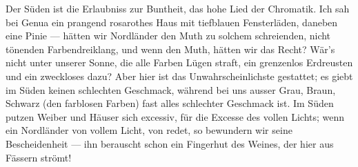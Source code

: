 Der Süden ist die Erlaubniss zur Buntheit, das hohe Lied der Chromatik. Ich sah bei Genua ein prangend rosarothes Haus mit tiefblauen Fensterläden, daneben eine Pinie — hätten wir Nordländer den Muth zu solchem schreienden, nicht tönenden Farbendreiklang, und wenn den Muth, hätten wir das Recht? Wär’s nicht unter unserer Sonne, die alle Farben Lügen straft, ein grenzenlos Erdreusten und ein zweckloses dazu? Aber hier ist das Unwahrscheinlichste gestattet; es giebt im Süden keinen schlechten Geschmack, während bei uns ausser Grau, Braun, Schwarz (den farblosen Farben) fast alles schlechter Geschmack ist. Im Süden putzen Weiber und Häuser sich excessiv, für die Excesse des vollen Lichts; wenn ein Nordländer von vollem Licht, von  redet, so bewundern wir seine Bescheidenheit — ihn berauscht schon ein Fingerhut des Weines, der hier aus Fässern strömt!
\par

